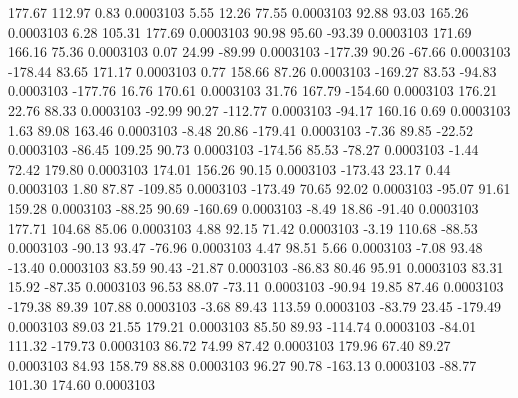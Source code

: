       177.67      112.97        0.83     0.0003103
        5.55       12.26       77.55     0.0003103
       92.88       93.03      165.26     0.0003103
        6.28      105.31      177.69     0.0003103
       90.98       95.60      -93.39     0.0003103
      171.69      166.16       75.36     0.0003103
        0.07       24.99      -89.99     0.0003103
     -177.39       90.26      -67.66     0.0003103
     -178.44       83.65      171.17     0.0003103
        0.77      158.66       87.26     0.0003103
     -169.27       83.53      -94.83     0.0003103
     -177.76       16.76      170.61     0.0003103
       31.76      167.79     -154.60     0.0003103
      176.21       22.76       88.33     0.0003103
      -92.99       90.27     -112.77     0.0003103
      -94.17      160.16        0.69     0.0003103
        1.63       89.08      163.46     0.0003103
       -8.48       20.86     -179.41     0.0003103
       -7.36       89.85      -22.52     0.0003103
      -86.45      109.25       90.73     0.0003103
     -174.56       85.53      -78.27     0.0003103
       -1.44       72.42      179.80     0.0003103
      174.01      156.26       90.15     0.0003103
     -173.43       23.17        0.44     0.0003103
        1.80       87.87     -109.85     0.0003103
     -173.49       70.65       92.02     0.0003103
      -95.07       91.61      159.28     0.0003103
      -88.25       90.69     -160.69     0.0003103
       -8.49       18.86      -91.40     0.0003103
      177.71      104.68       85.06     0.0003103
        4.88       92.15       71.42     0.0003103
       -3.19      110.68      -88.53     0.0003103
      -90.13       93.47      -76.96     0.0003103
        4.47       98.51        5.66     0.0003103
       -7.08       93.48      -13.40     0.0003103
       83.59       90.43      -21.87     0.0003103
      -86.83       80.46       95.91     0.0003103
       83.31       15.92      -87.35     0.0003103
       96.53       88.07      -73.11     0.0003103
      -90.94       19.85       87.46     0.0003103
     -179.38       89.39      107.88     0.0003103
       -3.68       89.43      113.59     0.0003103
      -83.79       23.45     -179.49     0.0003103
       89.03       21.55      179.21     0.0003103
       85.50       89.93     -114.74     0.0003103
      -84.01      111.32     -179.73     0.0003103
       86.72       74.99       87.42     0.0003103
      179.96       67.40       89.27     0.0003103
       84.93      158.79       88.88     0.0003103
       96.27       90.78     -163.13     0.0003103
      -88.77      101.30      174.60     0.0003103
